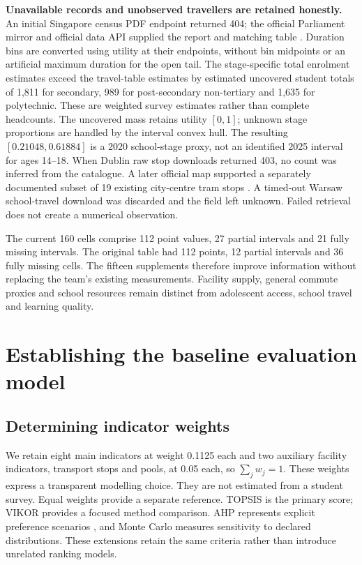 \textbf{Unavailable records and unobserved travellers are retained honestly.}
An initial Singapore census PDF endpoint returned 404; the official Parliament
mirror and official data API supplied the report and matching table
\cite{singapore}. Duration bins are converted using utility at their endpoints,
without bin midpoints or an artificial maximum duration for the open tail.
The stage-specific total enrolment estimates exceed the travel-table estimates
by estimated uncovered student totals of 1,811 for secondary, 989 for
post-secondary non-tertiary and 1,635 for polytechnic. These are weighted
survey estimates rather than complete headcounts. The uncovered mass retains
utility $[0,1]$; unknown stage proportions are
handled by the interval convex hull. The resulting $[0.21048,0.61884]$ is a
2020 school-stage proxy, not an identified 2025 interval for ages 14--18.
When Dublin raw stop downloads returned 403, no count was inferred from the
catalogue. A later official map supported a separately documented subset of
19 existing city-centre tram stops \cite{dublin}. A timed-out Warsaw school-travel download
was discarded and the field left unknown. Failed retrieval does not create a
numerical observation.

The current 160 cells comprise 112 point values, 27 partial intervals and
21 fully missing intervals. The original table had 112 points, 12 partial
intervals and 36 fully missing cells. The fifteen supplements therefore improve
information without replacing the team's existing measurements. Facility supply,
general commute proxies and school resources remain distinct from adolescent
access, school travel and learning quality.

\section{Establishing the baseline evaluation model}
\subsection{Determining indicator weights}
We retain eight main indicators at weight 0.1125 each and two auxiliary facility
indicators, transport stops and pools, at 0.05 each, so $\sum_jw_j=1$.
These weights express a transparent modelling choice. They are not estimated
from a student survey. Equal weights provide a separate reference.
TOPSIS is the primary score; VIKOR provides a focused method comparison.
AHP represents explicit preference scenarios \cite{saaty}, and Monte Carlo measures
sensitivity to declared distributions. These extensions retain the same
criteria rather than introduce unrelated ranking models.

